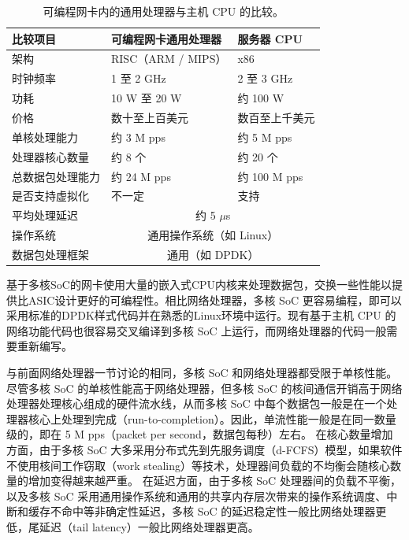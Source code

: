\begin{table}[htbp]
	\centering
	\caption{可编程网卡内的通用处理器与主机 CPU 的比较。}
	\small
	\begin{tabular}{l|p{}|p{}}
		\hline
		比较项目 & 可编程网卡通用处理器 & 服务器 CPU \\
		\hline
		\hline
		架构 & RISC（ARM / MIPS） & x86 \\
		\hline
		时钟频率 & 1 至 2 GHz & 2 至 3 GHz  \\
		\hline
		功耗 & 10 W 至 20 W & 约 100 W \\
		\hline
		价格 & 数十至上百美元 & 数百至上千美元 \\
		\hline
		单核处理能力 & 约 3 M pps & 约 5 M pps \\
		\hline
		处理器核心数量 & 约 8 个 & 约 20 个 \\
		\hline
		总数据包处理能力 & 约 24 M pps & 约 100 M pps \\
		\hline
		是否支持虚拟化 & 不一定 & 支持 \\
		\hline
		平均处理延迟 & \multicolumn{2}{c}{约 5 $\mu$s} \\
		\hline
		操作系统 & \multicolumn{2}{c}{通用操作系统（如 Linux）} \\
		\hline 
		数据包处理框架 & \multicolumn{2}{c}{通用（如 DPDK）} \\
		\hline
	\end{tabular}
	\label{background:tab:host-cpu}
\end{table}


基于多核SoC的网卡使用大量的嵌入式CPU内核来处理数据包，交换一些性能以提供比ASIC设计更好的可编程性。相比网络处理器，多核 SoC 更容易编程，即可以采用标准的DPDK样式代码并在熟悉的Linux环境中运行。现有基于主机 CPU 的网络功能代码也很容易交叉编译到多核 SoC 上运行，而网络处理器的代码一般需要重新编写。

与前面网络处理器一节讨论的相同，多核 SoC 和网络处理器都受限于单核性能。
尽管多核 SoC 的单核性能高于网络处理器，但多核 SoC 的核间通信开销高于网络处理器处理核心组成的硬件流水线，从而多核 SoC 中每个数据包一般是在一个处理器核心上处理到完成（run-to-completion）。因此，单流性能一般是在同一数量级的，即在 5 M pps（packet per second，数据包每秒）左右。
在核心数量增加方面，由于多核 SoC 大多采用分布式先到先服务调度（d-FCFS）模型，如果软件不使用核间工作窃取（work stealing）等技术，处理器间负载的不均衡会随核心数量的增加变得越来越严重。
在延迟方面，由于多核 SoC 处理器间的负载不平衡，以及多核 SoC 采用通用操作系统和通用的共享内存层次带来的操作系统调度、中断和缓存不命中等非确定性延迟，多核 SoC 的延迟稳定性一般比网络处理器更低，尾延迟（tail latency）一般比网络处理器更高。

